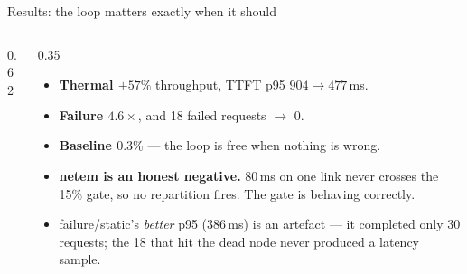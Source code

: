 \documentclass[aspectratio=169,9pt]{beamer}
\newcommand{\good}[1]{{\color{keGreen}#1}}
\newcommand{\bad}[1]{{\color{keRed}#1}}
\newcommand{\warn}[1]{{\color{keOrange}#1}}
\begin{document}
\begin{frame}[shrink=25]{Results: the loop matters exactly when it should}
\begin{columns}[T]
\begin{column}{0.62\textwidth}
\begin{tabular}{@{}llrrrrrr@{}}
        \bottomrule
      \end{tabular}
    \end{column}
    \begin{column}{0.35\textwidth}
      \scriptsize\raggedright
      \begin{itemize}\setlength\itemsep{0.4em}
        \item \good{\textbf{Thermal $+57\%$}} throughput, TTFT p95
          $904 \to 477$\,ms.
        \item \good{\textbf{Failure $4.6\times$}}, and 18 failed requests
          $\to$ 0.
        \item \textbf{Baseline $0.3\%$} --- the loop is free when nothing is
          wrong.
        \item \warn{\textbf{netem is an honest negative.}} 80\,ms on one link
          never crosses the 15\% gate, so no repartition fires. The gate is
          behaving correctly.
        \item \bad{failure/static's \emph{better} p95 (386\,ms) is an
          artefact} --- it completed only 30 requests; the 18 that hit the dead
          node never produced a latency sample.
      \end{itemize}
    \end{column}
  \end{columns}
\end{frame}
\end{document}
